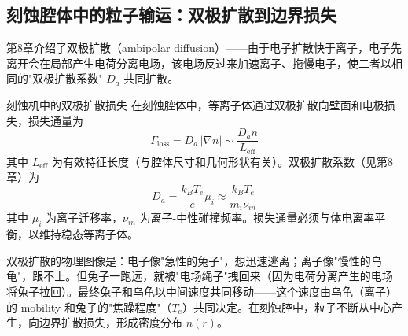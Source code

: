 \subsection{刻蚀腔体中的粒子输运：双极扩散到边界损失}

第8章介绍了双极扩散（ambipolar diffusion）——由于电子扩散快于离子，电子先离开会在局部产生电荷分离电场，该电场反过来加速离子、拖慢电子，使二者以相同的"双极扩散系数" $D_a$ 共同扩散。

\begin{theorem}{刻蚀机中的双极扩散损失}{}{}
\label{thm:ambipolar-etcher}
在刻蚀腔体中，等离子体通过双极扩散向壁面和电极损失，损失通量为
\begin{equation}
\label{eq:ambipolar-loss}
\Gamma_{\text{loss}} = D_a \,|\nabla n| \sim \frac{D_a n}{L_{\text{eff}}}
\end{equation}
其中 $L_{\text{eff}}$ 为有效特征长度（与腔体尺寸和几何形状有关）。双极扩散系数（见第8章）为
\begin{equation}
D_a = \frac{k_B T_e}{e} \mu_i \approx \frac{k_B T_e}{m_i \nu_{in}}
\end{equation}
其中 $\mu_i$ 为离子迁移率，$\nu_{in}$ 为离子-中性碰撞频率。损失通量必须与体电离率平衡，以维持稳态等离子体。
\end{theorem}

\begin{insight}{}{}
双极扩散的物理图像是：电子像"急性的兔子"，想迅速逃离；离子像"慢性的乌龟"，跟不上。但兔子一跑远，就被"电场绳子"拽回来（因为电荷分离产生的电场将兔子拉回）。最终兔子和乌龟以中间速度共同移动——这个速度由乌龟（离子）的 mobility 和兔子的"焦躁程度"（$T_e$）共同决定。在刻蚀腔中，粒子不断从中心产生，向边界扩散损失，形成密度分布 $n(r)$。
\end{insight}

